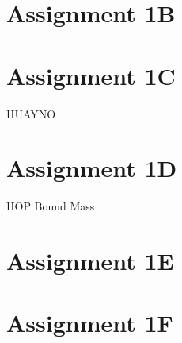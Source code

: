 \documentclass[a4paper]{article}
\begin{document}
\section*{Assignment 1B}

\section*{Assignment 1C}
HUAYNO \citep{2012NewA...17..711P}

\section*{Assignment 1D}
HOP Bound Mass \citep{1998ApJ...498..137E}

\section*{Assignment 1E}

\section*{Assignment 1F}

\newpage
 

\end{document}
